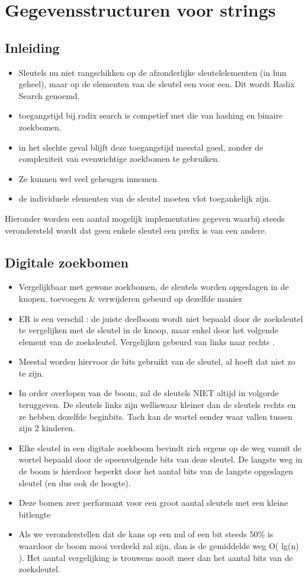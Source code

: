 \chapter{Gegevensstructuren voor strings}
\section{Inleiding}
\begin{itemize}
\item Sleutels nu niet rangschikken op de afzonderlijke sleutelelementen (in hun geheel), maar op de elementen van de sleutel een voor een. Dit wordt Radix Search genoemd.
\item toegangstijd bij radix search is competief met die van hashing en binaire zoekbomen. 
\item in het slechte geval blijft deze toegangstijd meestal goed, zonder de complexiteit van evenwichtige zoekbomen te gebruiken.
\item Ze kunnen wel veel geheugen innemen
\item de individuele elementen van de sleutel moeten vlot toegankelijk zijn. 
\end{itemize}

Hieronder worden een aantal mogelijk implementaties gegeven waarbij steeds verondersteld wordt dat geen enkele sleutel een prefix is van een andere.
\clearpage
\section{Digitale zoekbomen}
\begin{itemize}
\item Vergelijkbaar met gewone zoekbomen, de sleutels worden opgeslagen in de knopen, toevoegen \& verwijderen gebeurd op dezelfde manier
\item ER is een verschil : de juiste deelboom wordt niet bepaald door de zoeksleutel te vergelijken met de sleutel in de knoop, maar enkel door het volgende element van de zoeksleutel. Vergelijken gebeurd van links naar rechts .
\item Meestal worden hiervoor de bits gebruikt van de sleutel, al hoeft dat niet zo te zijn.
\item In order overlopen van de boom, zal de sleutels NIET altijd in volgorde teruggeven. De sleutels links zijn welliswaar kleiner dan de sleutels rechts en ze hebben dezelfde beginbits. Toch kan de wortel eender waar vallen tussen zijn 2 kinderen.
\item Elke sleutel in een digitale zoekboom bevindt zich ergens op de weg vanuit de wortel bepaald door de opeenvolgende bits van deze sleutel. De langste weg in de boom is hierdoor beperkt door het aantal bits van de langste opgeslagen sleutel (en dus ook de hoogte).
\item Deze bomen zeer performant voor een groot aantal sleutels met een kleine bitlengte
\item Als we veronderstellen dat de kans op een nul of een bit steeds 50\% is waardoor de boom mooi verdeeld zal zijn, dan is de gemiddelde weg O( lg(n) ). Het aantal vergelijking is trouwens nooit meer dan het aantal bits van de zoeksleutel.
\end{itemize}

